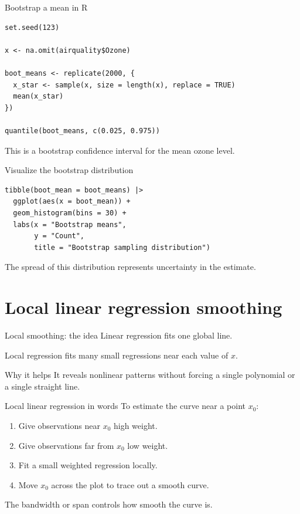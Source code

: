 \documentclass[aspectratio=169,11pt]{beamer}
\begin{document}
\begin{frame}[fragile]{Bootstrap a mean in R}
\begin{lstlisting}
set.seed(123)

x <- na.omit(airquality$Ozone)

boot_means <- replicate(2000, {
  x_star <- sample(x, size = length(x), replace = TRUE)
  mean(x_star)
})

quantile(boot_means, c(0.025, 0.975))
\end{lstlisting}

\vspace{0.3cm}
This is a bootstrap confidence interval for the mean ozone level.
\end{frame}

\begin{frame}[fragile]{Visualize the bootstrap distribution}
\begin{lstlisting}
tibble(boot_mean = boot_means) |>
  ggplot(aes(x = boot_mean)) +
  geom_histogram(bins = 30) +
  labs(x = "Bootstrap means",
       y = "Count",
       title = "Bootstrap sampling distribution")
\end{lstlisting}

\vspace{0.3cm}
The spread of this distribution represents uncertainty in the estimate.
\end{frame}

\section{Local linear regression smoothing}

\begin{frame}{Local smoothing: the idea}
Linear regression fits one global line.

\vspace{0.3cm}
Local regression fits many small regressions near each value of \(x\).

\vspace{0.4cm}
\begin{block}{Why it helps}
It reveals nonlinear patterns without forcing a single polynomial or a single straight line.
\end{block}
\end{frame}

\begin{frame}{Local linear regression in words}
To estimate the curve near a point \(x_0\):
\begin{enumerate}
  \item Give observations near \(x_0\) high weight.
  \item Give observations far from \(x_0\) low weight.
  \item Fit a small weighted regression locally.
  \item Move \(x_0\) across the plot to trace out a smooth curve.
\end{enumerate}

\vspace{0.3cm}
The bandwidth or span controls how smooth the curve is.
\end{frame}
\end{document}
